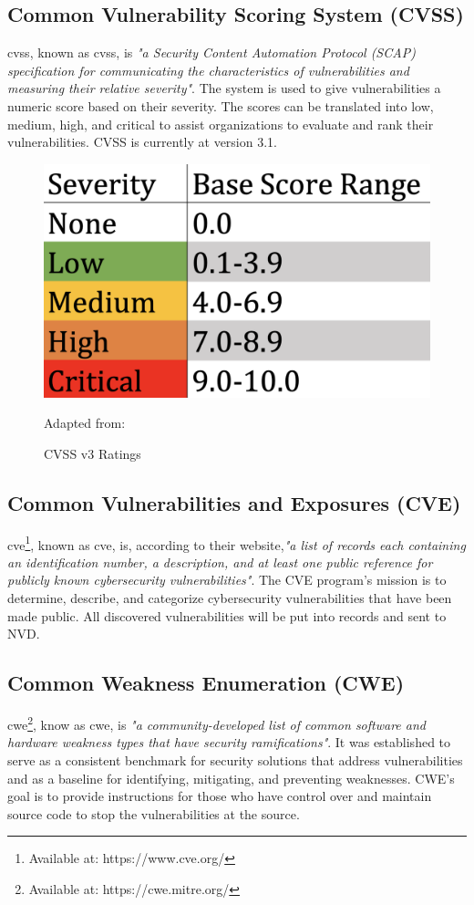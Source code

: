 \subsection{Common Vulnerability Scoring System (CVSS)}
\acrlong{cvss}, known as \acrshort{cvss}, is \textit{"a Security Content Automation Protocol (SCAP) specification for communicating the characteristics of vulnerabilities and measuring their relative severity"}\cite{nistCVSS}. The system is used to give vulnerabilities a numeric score based on their severity. The scores can be translated into low, medium, high, and critical to assist organizations to evaluate and rank their vulnerabilities. CVSS is currently at version 3.1. \cite{CVSS}
\begin{figure}[H]
    \centering
    \includegraphics[scale=0.3]{Images/CVSS.png}
    \caption{CVSS v3 Ratings} Adapted from:\cite{cvssrating}
    \label{fig:CVSS v3 Ratings}
\end{figure}


\subsection{Common Vulnerabilities and Exposures (CVE)}
\acrlong{cve}\footnote{Available at: https://www.cve.org/}, known as \acrshort{cve}, is, according to their website,\textit{"a list of records each containing an identification number, a description, and at least one public reference for publicly known cybersecurity vulnerabilities"}\cite{CVE}. The CVE program's mission is to determine, describe, and categorize cybersecurity vulnerabilities that have been made public. All discovered vulnerabilities will be put into records and sent to NVD.

\subsection{Common Weakness Enumeration (CWE)}
\label{cwe}
\acrlong{cwe}\footnote{Available at: https://cwe.mitre.org/}, know as \acrshort{cwe}, is \textit{"a community-developed list of common software and hardware weakness types that have security ramifications"}\cite{CWE}. It was established to serve as a consistent benchmark for security solutions that address vulnerabilities and as a baseline for identifying, mitigating, and preventing weaknesses. CWE's goal is to provide instructions for those who have control over and maintain source code to stop the vulnerabilities at the source. 

